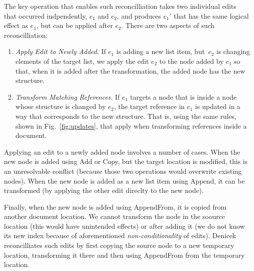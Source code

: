 \documentclass[sigconf]{acmart}
\newcommand{\ident}[1]{{\sffamily #1}}
\begin{document}
The key operation that enables such reconcilliation takes two individual edits that occurred
indpendently, $e_1$ and $e_2$, and produces $e_1'$ that has the same logical effect as
$e_1$, but can be applied after $e_2$. There are two aspects of such reconcilliation:

\begin{enumerate}
\item \emph{Apply Edit to Newly Added.} If $e_1$ is adding a new list item, but~$e_2$ is
  changing elements of the target list, we apply the edit $e_2$ to the node added by $e_1$ so
  that, when it is added after the transformation, the added node has the new structure.

\item \emph{Transform Matching References.} If $e_1$ targets a node that is inside a node
  whose structure is changed by $e_2$, the target reference in $e_1$ is updated in a way that
  corresponds to the new structure. That is, using the same rules, shown in Fig.~\ref{fig:updates},
  that apply when transforming references inside a document.
\end{enumerate}

Applying an edit to a newly added node involves a number of cases. When the new node is added
using \ident{Add} or \ident{Copy}, but the target location is modified, this is an unresolvable
conflict (because those two operations would overwrite existing nodes). When the new node is
added as a new list item using \ident{Append}, it can be transformed (by applying the other
edit direclty to the new node).

Finally, when the new node is added using \ident{AppendFrom},
it is copied from another document location. We cannot transform the node in the soource location
(this would have unintended effects) or after adding it (we do not know its new index because of
aforementioned \emph{non-conditionality} of edits). Denicek reconcilliates such edits by first
copying the source node to a new temporary location, transforming it there and then using
\ident{AppendFrom} from the temporary location.


\end{document}

